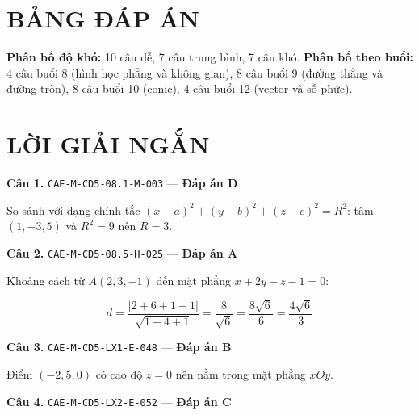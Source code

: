 \documentclass[11pt, a4paper]{article}
\begin{document}

\section{BẢNG ĐÁP ÁN}


\textbf{Phân bố độ khó:} 10 câu dễ, 7 câu trung bình, 7 câu khó.
\textbf{Phân bố theo buổi:} 4 câu buổi 8 (hình học phẳng và không gian), 8 câu buổi 9 (đường thẳng và đường tròn), 8 câu buổi 10 (conic), 4 câu buổi 12 (vector và số phức).

\section{LỜI GIẢI NGẮN}

\textbf{Câu 1.} \texttt{CAE-M-CD5-08.1-M-003} — \textbf{Đáp án D}

So sánh với dạng chính tắc $(x-a)^2 + (y-b)^2 + (z-c)^2 = R^2$: tâm $(1,-3,5)$ và $R^2 = 9$ nên $R = 3$.

\textbf{Câu 2.} \texttt{CAE-M-CD5-08.5-H-025} — \textbf{Đáp án A}

Khoảng cách từ $A(2,3,-1)$ đến mặt phẳng $x + 2y - z - 1 = 0$:

$$d = \frac{\lvert 2 + 6 + 1 - 1 \rvert}{\sqrt{1 + 4 + 1}} = \frac{8}{\sqrt{6}} = \frac{8\sqrt{6}}{6} = \frac{4\sqrt{6}}{3}$$

\textbf{Câu 3.} \texttt{CAE-M-CD5-LX1-E-048} — \textbf{Đáp án B}

Điểm $(-2, 5, 0)$ có cao độ $z = 0$ nên nằm trong mặt phẳng $xOy$.

\textbf{Câu 4.} \texttt{CAE-M-CD5-LX2-E-052} — \textbf{Đáp án C}
\end{document}
